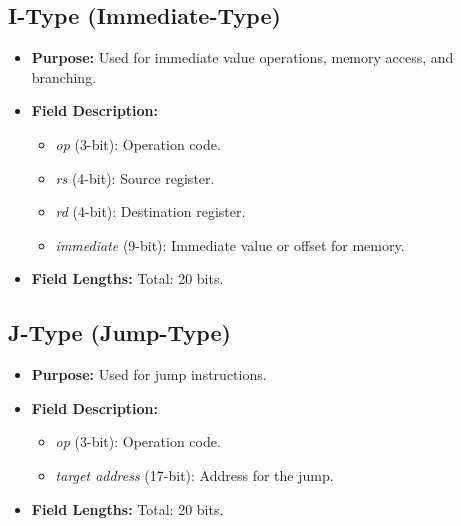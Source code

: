 \documentclass[12pt, onecolumn]{report}
\begin{document}
\subsection*{I-Type (Immediate-Type)}
\begin{itemize}
    \item \textbf{Purpose:} Used for immediate value operations, memory access, and branching.
    \item \textbf{Field Description:}
    \begin{itemize}
        \item \textit{op} (3-bit): Operation code.
        \item \textit{rs} (4-bit): Source register.
        \item \textit{rd} (4-bit): Destination register.
        \item \textit{immediate} (9-bit): Immediate value or offset for memory.
    \end{itemize}
    \item \textbf{Field Lengths:} Total: 20 bits.
\end{itemize}

\subsection*{J-Type (Jump-Type)}
\begin{itemize}
    \item \textbf{Purpose:} Used for jump instructions.
    \item \textbf{Field Description:}
    \begin{itemize}
        \item \textit{op} (3-bit): Operation code.
        \item \textit{target address} (17-bit): Address for the jump.
    \end{itemize}
    \item \textbf{Field Lengths:} Total: 20 bits.
\end{itemize}
\end{document}
